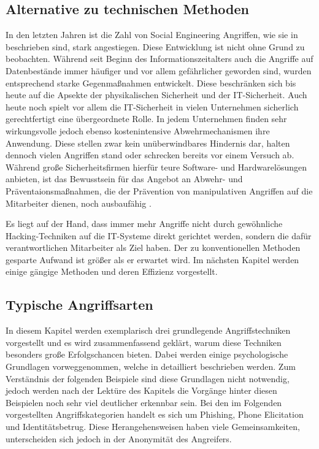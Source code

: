 \subsection{Alternative zu technischen Methoden}\label{sec:alternative_zu_technischen_methoden}
In den letzten Jahren ist die Zahl von Social Engineering Angriffen, wie sie in \citep{the-art-of-deception} beschrieben sind, stark angestiegen.
Diese Entwicklung ist nicht ohne Grund zu beobachten.
Während seit Beginn des Informationszeitalters auch die Angriffe auf Datenbestände immer häufiger und
vor allem gefährlicher geworden sind, wurden entsprechend starke Gegenmaßnahmen entwickelt.
Diese beschränken sich bis heute auf die Apsekte der physikalischen Sicherheit und der IT-Sicherheit.
Auch heute noch spielt vor allem die IT-Sicherheit in vielen Unternehmen sicherlich gerechtfertigt
eine übergeordnete Rolle.
In jedem Unternehmen finden sehr wirkungsvolle jedoch ebenso kostenintensive Abwehrmechanismen ihre Anwendung.
Diese stellen zwar kein unüberwindbares Hindernis dar, halten dennoch vielen Angriffen stand oder
schrecken bereits vor einem Versuch ab.
Während große Sicherheitsfirmen hierfür teure Software- und Hardwarelösungen anbieten, ist das Bewusstsein für das Angebot an Abwehr- und Präventaionsmaßnahmen, die der Prävention von manipulativen Angriffen auf
die Mitarbeiter dienen, noch ausbaufähig \citep{hacking-the-human}.

Es liegt auf der Hand, dass immer mehr Angriffe nicht durch gewöhnliche Hacking-Techniken auf die IT-Systeme direkt gerichtet werden, sondern die dafür verantwortlichen Mitarbeiter als Ziel haben.
Der zu konventionellen Methoden gesparte Aufwand ist größer als er erwartet wird.
Im nächsten Kapitel werden einige gängige Methoden und deren Effizienz vorgestellt.

\subsection{Typische Angriffsarten}\label{sec:gangige_angriffe}
In diesem Kapitel werden exemplarisch drei grundlegende Angriffstechniken vorgestellt und es wird zusammenfassend geklärt, warum diese Techniken besonders große Erfolgschancen bieten.
Dabei werden einige psychologische Grundlagen vorweggenommen, welche in  detailliert
beschrieben werden.
Zum Verständnis der folgenden Beispiele sind diese Grundlagen nicht notwendig, jedoch werden nach der
Lektüre des Kapitels  die Vorgänge hinter diesen Beispielen noch sehr viel deutlicher erkennbar sein.
Bei den im Folgenden vorgestellten Angriffskategorien handelt es sich um Phishing, Phone Elicitation und Identitätsbetrug. Diese Herangehensweisen haben viele Gemeinsamkeiten, unterscheiden sich jedoch in der Anonymität des Angreifers.

